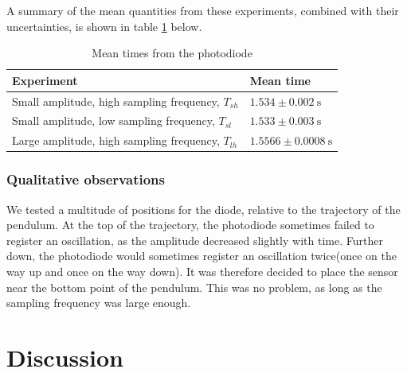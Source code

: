 \documentclass[a4paper, 10pt]{article}
\begin{document}
\linebreak
A summary of the mean quantities from these experiments, combined with their uncertainties, is shown in table \ref{tab:mean_times_photodiode} below.
\begin{table}[hb!]
\centering
\caption{Mean times from the photodiode}
\label{tab:mean_times_photodiode}
\begin{tabular}{|l|l|}
\hline
\textbf{Experiment}                              & \textbf{Mean time}                 \\
\hline
Small amplitude, high sampling frequency, $T_{sh}$     & $1.534 \pm 0.002 \ \mathrm{s}$ \\
Small amplitude, low sampling frequency, $T_{sl}$ & $1.533 \pm 0.003\ \mathrm{s}$   \\
Large amplitude, high sampling frequency, $T_{lh}$ & $1.5566 \pm 0.0008\ \mathrm{s}$   \\
\hline 
\end{tabular}
\end{table}
\subsubsection{Qualitative observations} \label{photodiode_qualitat}
We tested a multitude of positions for the diode, relative to the trajectory of the pendulum. At the top of the trajectory, the photodiode sometimes failed to register an oscillation, as the amplitude decreased slightly with time. Further down, the photodiode would sometimes register an oscillation twice(once on the way up and once on the way down). It was therefore decided to place the sensor near the bottom point of the pendulum. This was no problem, as long as the sampling frequency was large enough.
\section{Discussion}
\end{document}
